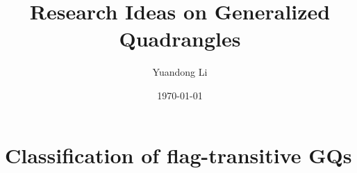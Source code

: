 \documentclass[a4paper,11pt,openany]{book}
\title{Research Ideas on Generalized Quadrangles}
\author{Yuandong Li}
\date{\today}
\begin{document}
\maketitle

\tableofcontents

\chapter{Classification of flag-transitive GQs}
\end{document}
